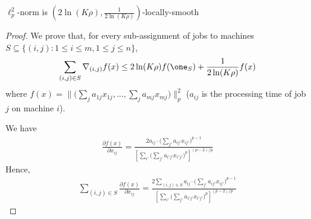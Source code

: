 \begin{lemma} \label{lem-makespan}
$\ell_{p}^{2}$-norm is $(2\ln(K\rho),\frac{1}{2\ln(K\rho)})$-locally-smooth
\end{lemma}
%
\begin{proof}
We prove that, for every sub-assignment of jobs to machines $S \subseteq \{(i,j): 1 \leq i \leq m, 1 \leq j \leq n\}$,
%
\begin{align}	\label{ineq:lp-smooth}
\sum_{(i,j) \in S} \nabla_{(i,j)} f(x) \leq 2 \ln(K\rho) f(\one_{S}) + \frac{1}{2\ln(K\rho)} f(x)
\end{align}
where $f(x) = \| \bigl( \sum_{j} a_{1j} x_{1j}, \ldots, \sum_{j} a_{mj} x_{mj} \bigr)\|_{p}^{2}$
($a_{ij}$ is the processing time of job $j$ on machine $i$).


We have
%
\begin{align*}
\frac{\partial f(x)}{\partial x_{ij}}
= \frac{2a_{ij} \cdot \bigl( \sum_{j'} a_{ij'} x_{ij'} \bigr)^{p-1} }{ \left[ \sum_{i'} \bigl( \sum_{j'} a_{i'j'} x_{i'j'} \bigr)^{p} \right]^{(p-2)/p}}
\end{align*}
Hence,
\begin{align*}
\sum_{(i,j) \in S} \frac{\partial f(x)}{\partial x_{ij}}
= \frac{ 2 \sum_{(i,j) \in S} a_{ij} \cdot \bigl( \sum_{j'} a_{ij'} x_{ij'} \bigr)^{p-1} }{ \left[ \sum_{i'} \bigl( \sum_{j'} a_{i'j'} x_{i'j'} \bigr)^{p} \right]^{(p-2)/p}}
\end{align*}


\end{proof}
